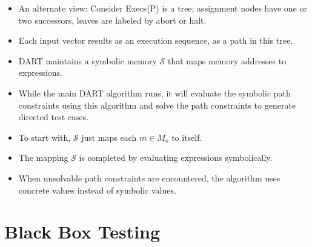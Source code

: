 \documentclass[a4paper]{article}
\begin{document}
\begin{itemize}
    \item An alternate view: Consider Execs(P) is a tree; assignment nodes have one or two successors, leaves are labeled by abort or halt.
    \item Each input vector results as an execution sequence, as a path in this tree.
    \item DART maintains a symbolic memory $\mathcal{S}$ that maps memory addresses to expressions.
    \item While the main DART algorithm runs, it will evaluate the symbolic path constraints using this algorithm and solve the path constraints to generate directed test cases.
    \item To start with, $\mathcal{S}$ just maps each $m\in M_o$ to itself.
    \item The mapping $\mathcal{S}$ is completed by evaluating expressions symbolically.
    \item When unsolvable path constraints are encountered, the algorithm uses concrete values instead of symbolic values.
\end{itemize}

\section{Black Box Testing}
\end{document}
